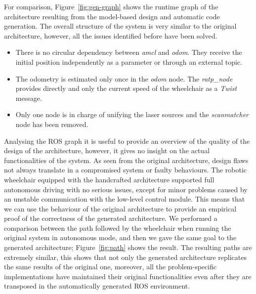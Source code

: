 For comparison, Figure~\ref{fig:gen-graph} shows the runtime graph of the architecture resulting from the model-based design and automatic code generation. The overall structure of the system is very similar to the original architecture, however, all the issues identified before have been solved.
\begin{itemize}
\item There is no circular dependency between \textit{amcl} and \textit{odom}. They receive the initial position independently as a parameter or through an external topic.
\item The odometry is estimated only once in the \textit{odom} node. The \textit{ratp\_node} provides directly and only the current speed of the wheelchair as a \textit{Twist} message.
\item Only one node is in charge of unifying the laser sources and the \textit{scanmatcher} node has been removed.
\end{itemize}

Analysing the ROS graph it is useful to provide an overview of the quality of the design of the architecture, however, it gives no insight on the actual functionalities of the system. As seen from the original architecture, design flaws not always translate in a compromised system or faulty behaviours. The robotic wheelchair equipped with the handcrafted architecture supported full autonomous driving with no serious issues, except for minor problems caused by an unstable communication with the low-level control module. This means that we can use the behaviour of the original architecture  to provide an empirical proof of the correctness of the generated architecture. We performed a comparison between the path followed by the wheelchair when running the original system in autonomous mode, and then we gave the same goal to the generated architecture; Figure~\ref{fig:path} shows the result. The resulting paths are extremely similar, this shows that not only the generated architecture replicates the same results of the original one, moreover, all the problem-specific implementations have maintained their original functionalities even after they are transposed in the automatically generated ROS environment.

